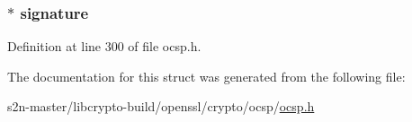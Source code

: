 \subsubsection[{\texorpdfstring{signature}{signature}}]{ $\ast$ signature}\hypertarget{structocsp__basic__response__st_a0ded22400c40848a864a98aeb7946f1a}{}\label{structocsp__basic__response__st_a0ded22400c40848a864a98aeb7946f1a}


Definition at line 300 of file ocsp.\+h.



The documentation for this struct was generated from the following file\+:\begin{DoxyCompactItemize}
\item 
s2n-\/master/libcrypto-\/build/openssl/crypto/ocsp/\hyperlink{crypto_2ocsp_2ocsp_8h}{ocsp.\+h}\end{DoxyCompactItemize}
